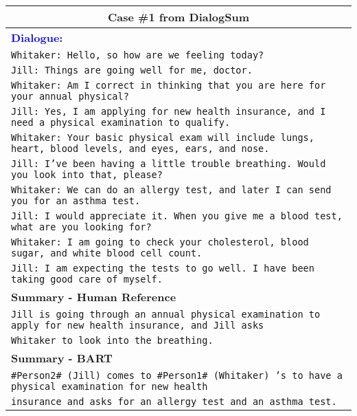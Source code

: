 \documentclass[11pt]{article}
\begin{document}
\begin{table*}[t]
        \centering
        \begin{adjustbox}{width=1.00\textwidth,center}
        \begin{tabular}{ | l | }
        \toprule
        \multicolumn{1}{|c|}{\textbf{Case \#1 from DialogSum}} \\ \hline
        \textbf{\textcolor{blue}{Dialogue:}} \\ \hline

        \texttt{Whitaker: Hello, so how are we feeling today? } \\
        \texttt{Jill: Things are going well for me, doctor. } \\
        \texttt{Whitaker: Am I correct in thinking that you are here for your annual physical? } \\
        \texttt{Jill: Yes, I am applying for new health insurance, and I need a physical examination to qualify. } \\
        \texttt{Whitaker: Your basic physical exam will include lungs, heart, blood levels, and eyes, ears, and nose.} \\
        \texttt{Jill: I've been having a little trouble breathing. Would you look into that, please? } \\
        \texttt{Whitaker: We can do an allergy test, and later I can send you for an asthma test. } \\
        \texttt{Jill: I would appreciate it. When you give me a blood test, what are you looking for?} \\
        \texttt{Whitaker: I am going to check your cholesterol, blood sugar, and white blood cell count. } \\
        \texttt{Jill: I am expecting the tests to go well. I have been taking good care of myself.} \\
        
        \hline \hline
        
        \textbf{Summary - Human Reference} \\ \hline
        \texttt{Jill is going through an annual physical examination to apply for new health insurance, and Jill asks } \\
        \texttt{Whitaker to look into the breathing.} \\ \hline
        
        \textbf{Summary - BART} \\ \hline 
        \texttt{\#Person2\# (Jill) comes to \#Person1\# (Whitaker) 's  to have a physical examination for new health } \\
        \texttt{insurance and asks for an allergy test and an asthma test.}  \\ \hline \hline
        

\end{tabular}
\end{adjustbox}
\end{table*}
\end{document}
